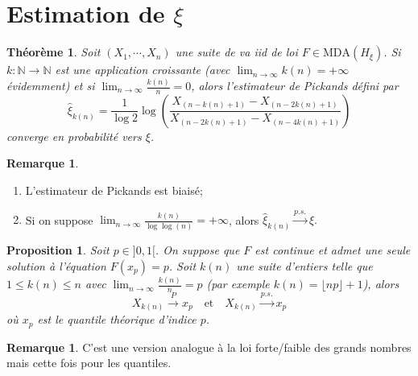 \documentclass[10p,a4paper,reqno,titlepage]{report}
\newcommand{\N}{\mathbb{N}}
\newcounter{dader}[chapter]
\theoremstyle{plain}
\newtheorem{thm}[thms]{Théorème}
\newtheorem{prop}[prop]{Proposition}
\theoremstyle{definition}
\newtheorem{rem}[dader]{Remarque}
\newcommand{\cvps}{\stackrel{p.s.}{\longrightarrow}}
\newcommand{\cvP}{\stackrel{P}{\longrightarrow}}
\begin{document}
\section{Estimation de $\xi$}
\begin{thm}
	Soit $(X_1,\cdots,X_n)$ une suite de va iid de loi $F \in \mathrm{MDA}(H_\xi)$. Si $k:\N\to \N$ est une application croissante (avec $\lim_{n\to\infty} k(n)=+\infty$ évidemment) et si $\lim_{n\to\infty} \tfrac{k(n)}{n}=0$, alors l'estimateur de Pickands défini par 
	$$ \widehat{\xi}_{k(n)} = \frac{1}{\log 2} \log\left(\frac{X_{(n-k(n)+1)} -X_{(n-2k(n)+1)}}{X_{(n-2k(n)+1)}- X_{(n -4k(n)+1)}}\right)$$
	converge en probabilité vers $\xi$.
\end{thm}
\begin{rem}\
\begin{enumerate}
	\item L'estimateur de Pickands est biaisé;
	\item Si on suppose $\lim_{n\to \infty} \tfrac{k(n)}{\log \log (n)}=+\infty$, alors $\widehat{\xi}_{k(n)}\cvps \xi.$
\end{enumerate}
\end{rem}
\begin{prop}
	Soit $p \in ]0,1[$. On suppose que $F$ est continue et admet une seule solution à l'équation $F(x_p)=p$. Soit $k(n)$ une suite d'entiers telle que $1 \leq k(n) \leq n$ avec $\lim_{n\to\infty}\tfrac{k(n)}{n}=p$ (par exemple $k(n)= \lfloor np \rfloor +1$), alors 
	$$ X_{k(n)} \cvP x_p\quad \text{et}\quad X_{k(n)}\cvps x_p$$
	où $x_p$ est le quantile théorique d'indice $p$.
\end{prop}
\begin{rem}
	C'est une version analogue à la loi forte/faible des grands nombres mais cette fois pour les quantiles.
\end{rem}
\end{document}
